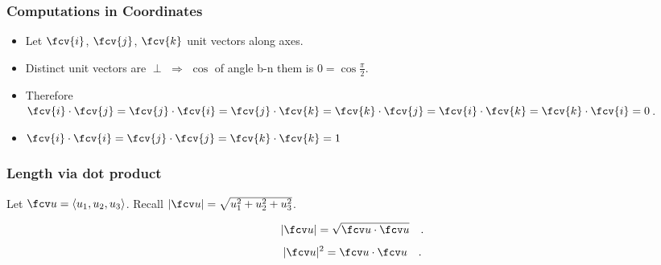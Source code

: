 \begin{frame}
\frametitle{Computations in Coordinates}
\begin{itemize}
\item<1-> Let $\fcv{i}$, $\fcv{j}$, $\fcv{k}$ unit vectors along axes.
\item<2-> Distinct unit vectors are $\perp$ $\Rightarrow$ $\cos$ of angle b-n them is $0=\cos \frac{\pi}{2}$.
\item<3-> Therefore \alert<7>{$ \fcv{i} \cdot \fcv{j} = \fcv{j} \cdot \fcv{i} = \fcv{j} \cdot \fcv{k}= \fcv{k} \cdot \fcv{j} = \fcv{i} \cdot \fcv{k} = \fcv{k} \cdot \fcv{i} = 0$}.
\item<4-> \alert<8>{$\fcv{i} \cdot \fcv{i} = \fcv{j} \cdot \fcv{j} = \fcv{k} \cdot \fcv{k} = 1$}
\end{itemize}
\end{frame}

\begin{frame}
\frametitle{Length via dot product}
Let $\fcv u=\langle u_1, u_2, u_3\rangle$. Recall $|\fcv u|=\sqrt{u_1^2+u_2^2+u_3^2}$.
\begin{observation}
\[
|\fcv u|= \sqrt{ \fcv u \cdot \fcv u}\quad .
\]
\[
|\fcv u|^2= \fcv u \cdot \fcv u\quad .
\]
\end{observation}
\end{frame}

